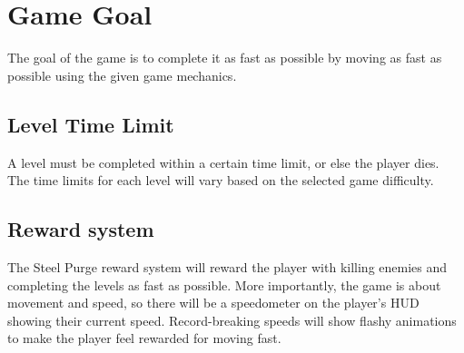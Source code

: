 \documentclass[../Main.tex]{subfiles}
\begin{document}
\section{Game Goal}

The goal of the game is to complete it as fast as possible by moving as fast as possible using the given game mechanics. 

\subsection{Level Time Limit}

A level must be completed within a certain time limit, or else the player dies. The time limits for each level will vary based on the selected game difficulty.

\subsection{Reward system}

The Steel Purge reward system will reward the player with killing enemies and completing the levels as fast as possible. More importantly, the game is about movement and speed, so there will be a speedometer on the player's HUD showing their current speed. Record-breaking speeds will show flashy animations to make the player feel rewarded for moving fast. 
\end{document}
